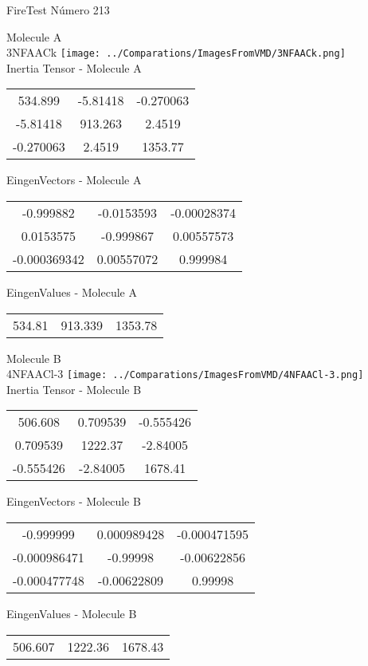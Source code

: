 \vtab[-2cm]
\begin{center}
{\large FireTest \tab Número 213}
\end{center}
\begin{multicols}{2}
\begin{center}

Molecule A \\ 
3NFAACk
\texttt{[image: ../Comparations/ImagesFromVMD/3NFAACk.png]}
\\
Inertia Tensor - Molecule A \\
\vtab

\begin{tabular}{|c c c|}
534.899	 & 	-5.81418	 & 	-0.270063	 \\
-5.81418	 & 	913.263	 & 	2.4519	 \\
-0.270063	 & 	2.4519	 & 	1353.77
\end{tabular}

\vtab
 EingenVectors - Molecule A     \\
\vtab
\begin{tabular}{|c c c|}
-0.999882	 & 	-0.0153593	 & 	-0.00028374	 \\
0.0153575	 & 	-0.999867	 & 	0.00557573	 \\
-0.000369342	 & 	0.00557072	 & 	0.999984
\end{tabular}

\vtab
 EingenValues - Molecule A     \\
\vtab
\begin{tabular}{|c c c|}
534.81	 & 	913.339	 & 	1353.78	 \\
\end{tabular}
\columnbreak

Molecule B \\ 
4NFAACl-3
\texttt{[image: ../Comparations/ImagesFromVMD/4NFAACl-3.png]}
\\
Inertia Tensor - Molecule B \\
\vtab

\begin{tabular}{|c c c|}
506.608	 & 	0.709539	 & 	-0.555426	 \\
0.709539	 & 	1222.37	 & 	-2.84005	 \\
-0.555426	 & 	-2.84005	 & 	1678.41
\end{tabular}

\vtab
 EingenVectors - Molecule B     \\
\vtab
\begin{tabular}{|c c c|}
-0.999999	 & 	0.000989428	 & 	-0.000471595	 \\
-0.000986471	 & 	-0.99998	 & 	-0.00622856	 \\
-0.000477748	 & 	-0.00622809	 & 	0.99998
\end{tabular}

\vtab
 EingenValues - Molecule B     \\
\vtab
\begin{tabular}{|c c c|}
506.607	 & 	1222.36	 & 	1678.43	 \\
\end{tabular}

\end{center}
\end{multicols}
